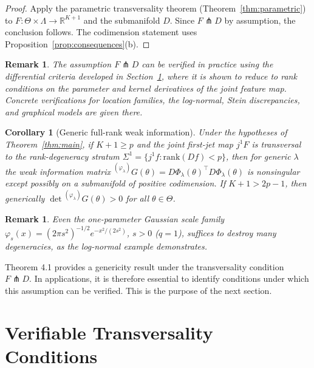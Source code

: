 \documentclass[11pt,a4paper]{article}
\newtheorem{corollary}[theorem]{Corollary}
\newtheorem{remark}[theorem]{Remark}
\newcommand{\R}{\mathbb{R}}
\begin{document}
\begin{proof}
Apply the parametric transversality theorem
(Theorem~\ref{thm:parametric}) to $F:\Theta\times\Lambda\to\R^{K+1}$
and the submanifold $D$.  Since $F\pitchfork D$ by assumption, the
conclusion follows.  The codimension statement uses
Proposition~\ref{prop:consequences}(b).
\end{proof}

\begin{remark}
The assumption $F \pitchfork D$ can be verified in practice using the
differential criteria developed in
Section~\ref{sec:transversality_condition_dim}, where it is shown to
reduce to rank conditions on the parameter and kernel derivatives of
the joint feature map.  Concrete verifications for location families,
the log-normal, Stein discrepancies, and graphical models are given
there.
\end{remark}

\begin{corollary}[Generic full-rank weak information]
\label{cor:full_rank}
Under the hypotheses of Theorem~\ref{thm:main}, if $K+1\geq p$ and
the joint first-jet map $j^1F$ is transversal to the rank-degeneracy
stratum $\Sigma^1 = \{j^1f:\mathrm{rank}(Df)<p\}$, then for generic
$\lambda$ the weak information matrix
${}^{(\varphi_\lambda)}\!G(\theta) = D\Phi_\lambda(\theta)^\top
D\Phi_\lambda(\theta)$ is nonsingular except possibly on a
submanifold of positive codimension.  If $K+1 > 2p-1$, then
generically $\det {}^{(\varphi_\lambda)}\!G(\theta)>0$ for all
$\theta\in\Theta$.
\end{corollary}

\begin{remark}
Even the one-parameter Gaussian scale family
$\varphi_s(x) = (2\pi s^2)^{-1/2}e^{-x^2/(2s^2)}$, $s>0$
($q=1$), suffices to destroy many degeneracies, as the log-normal
example demonstrates.
\end{remark}

Theorem 4.1 provides a genericity result under the transversality condition
$F \pitchfork D$. In applications, it is therefore essential to identify
conditions under which this assumption can be verified. This is the purpose
of the next section.

\section{Verifiable Transversality Conditions}
\label{sec:transversality_condition_dim}
\end{document}

